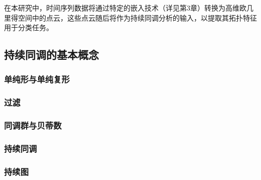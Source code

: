 在本研究中，时间序列数据将通过特定的嵌入技术（详见第3章）转换为高维欧几里得空间中的点云，这些点云随后将作为持续同调分析的输入，以提取其拓扑特征用于分类任务。

\subsection{持续同调的基本概念}
\subsubsection{单纯形与单纯复形}
\subsubsection{过滤}
\subsubsection{同调群与贝蒂数}
\subsubsection{持续同调}
\subsubsection{持续图}
